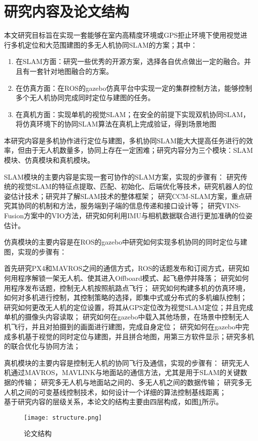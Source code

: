 \section{研究内容及论文结构}
本文研究目标旨在实现一套能够在室内高精度环境或GPS拒止环境下使用视觉进行多机定位和大范围建图的多无人机协同SLAM的方案；其中：

\begin{enumerate}
	\item 在SLAM方面：研究一些优秀的开源方案，选择各自优点做出一定的融合。并且有一套针对地图融合的方案。
	\item 在仿真方面：在ROS的gazebo仿真平台中实现一定的集群控制方法，能够控制多个无人机协同完成同时定位与建图的任务。
	\item 在真机方面：实现单机的视觉SLAM；在安全的前提下实现双机协同SLAM，将仿真环境下的协同SLAM算法在真机上完成验证，得到场景地图
\end{enumerate}

本研究内容是多机协作进行定位与建图，多机协同SLAM能大大提高任务进行的效率，但由于无人机数量多，协同上存在一定困难；研究内容分为三个模块：SLAM模块、仿真模块和真机模块。

SLAM模块的主要内容是实现一套可协作的SLAM方案，实现的步骤有：
研究传统的视觉SLAM的特征点提取、匹配、初始化、后端优化等技术，研究机器人的位姿估计技术；研究并了解SLAM技术的整体框架；
研究CCM-SLAM方案，重点研究其协同的机制和方法，服务端到子端的信息传递和接口设计等；
研究VINS-Fusion方案中的VIO方法，研究如何利用IMU与相机数据联合进行更加准确的位姿估计。

仿真模块的主要内容是在ROS的gazebo中研究如何实现多机协同的同时定位与建图，实现的步骤有：

首先研究PX4和MAVROS之间的通信方式，ROS的话题发布和订阅方式，研究如何用程序解锁一架无人机、使其进入Offboard模式、起飞悬停并降落；
研究如何用程序发布话题，控制无人机按照航路点飞行；
研究如何构建多机的仿真环境，如何对多机进行控制，其控制策略的选择，即集中式或分布式的多机编队控制；
研究如何更改无人机的定位设置，将其从GPS定位改为视觉SLAM定位；并且完成单机的摄像头内容读取；
研究如何在gazebo中载入其他场景，在场景中控制无人机飞行，并且对拍摄到的画面进行建图，完成自身定位；
研究如何在gazebo中完成多机基于视觉的同时定位与建图，并且拼合地图，用第三方软件显示；研究多机的联合优化与协同方法；

真机模块的主要内容是控制无人机的协同飞行及通信，实现的步骤有：
研究无人机通过MAVROS，MAVLINK与地面站的通信方法，尤其是用于SLAM的关键数据的传输；
研究多无人机与地面站之间的、多无人机之间的数据传输；
研究多无人机之间的可变基线控制技术，如何设计一个详细的算法控制基线距离；
~\\
基于研究内容的层级关系，本论文的结构主要由四层构成，如图\ref{fig1}所示。
\vspace{10pt}
\begin{figure}[!ht]
\centering
\texttt{[image: structure.png]}
\caption{论文结构 }
\label{fig1}
\end{figure}


